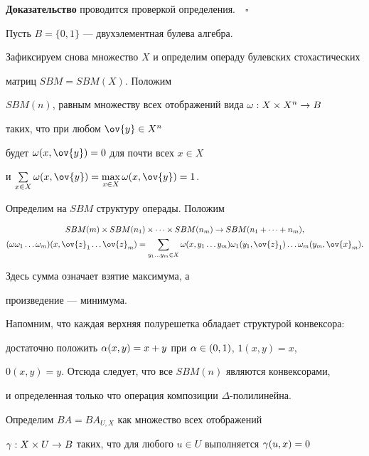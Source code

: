 {\bf Доказательство} проводится проверкой определения.$\quad\square$


\medskip





Пусть $B=\{ 0,1 \}$ --- двухэлементная булева алгебра.


Зафиксируем снова множество $X$ и определим операду булевских стохастических


матриц $SBM=SBM(X)$. Положим


$SBM(n)$, равным множеству всех отображений вида $\omega :X \times X^n \to B$


таких, что при любом $ \ov{y} \in X^n$


будет $\o (x,\ov{y})=0$ для почти всех $ x\in X$


и $\sum \limits_{x \in X} \o (x,\ov{y})=


\mathop{\max}\limits_{x \in X} \o(x,\ov{y})=1 $.


Определим на $SBM$ структуру операды. Положим


\begin{gather*}


SBM(m)\times SBM(n_1)\times \dotsb \times SBM(n_m) \to


SBM(n_1+\dotsb + n_m),\\


(\o \o _1 \dotsc \o _m)(x,\ov{z}_1\dotsc \ov{z}_m)=


\sum_{y_1 \dotsc y_m \in X}


\o(x,y_1 \dotsc y_m)\o _1(y_1,\ov{z}_1)\dotsc \o_m(y_m,\ov{ x}_m).


\end{gather*}


Здесь сумма означает взятие максимума, а


произведение --- минимума.





Напомним, что каждая верхняя полурешетка обладает структурой конвексора:


достаточно положить $\alpha(x,y)=x+y$ при $\alpha\in (0,1)$, $1(x,y)=x$,


$0(x,y)=y$. Отсюда следует, что все $SBM(n)$ являются конвексорами,


и определенная только что операция композиции $\Delta$-полилинейна.


Определим $ BA=BA_{U,X}$ как множество всех отображений


$\gamma: X\times U\to B$ таких, что для любого $ u\in U$ выполняется $\gamma(u,x)=0$


